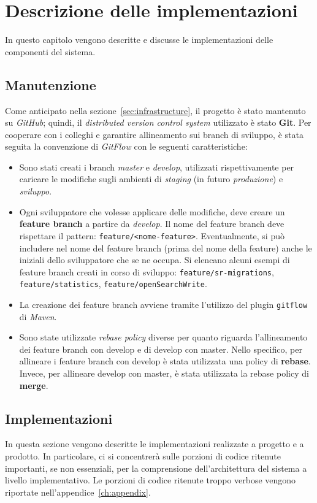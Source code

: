 \clearpage
\chapter{Descrizione delle implementazioni}\label{ch:implementation}
In questo capitolo vengono descritte e discusse le implementazioni delle componenti del sistema.

\section{Manutenzione}\label{sec:mantainance}
Come anticipato nella sezione~\ref{sec:infrastructure}, il progetto è stato mantenuto su \textit{GitHub};
quindi, il \textit{distributed version control system} utilizzato è stato \textbf{Git}.
Per cooperare con i colleghi e garantire allineamento sui branch di sviluppo, è stata seguita la convenzione di \textit{GitFlow} con le seguenti caratteristiche:
\begin{itemize}
    \item Sono stati creati i branch \textit{master} e \textit{develop}, utilizzati rispettivamente per caricare le modifiche sugli ambienti di \textit{staging} (in futuro \textit{produzione}) e \textit{sviluppo}.
    \item Ogni sviluppatore che volesse applicare delle modifiche, deve creare un \textbf{feature branch} a partire da \textit{develop}.
    Il nome del feature branch deve rispettare il pattern: \texttt{feature/<nome-feature>}.
    Eventualmente, si può includere nel nome del feature branch (prima del nome della feature) anche le iniziali dello sviluppatore che se ne occupa.
    Si elencano alcuni esempi di feature branch creati in corso di sviluppo: \texttt{feature/sr-migrations}, \texttt{feature/statistics}, \texttt{feature/openSearchWrite}.
    \item La creazione dei feature branch avviene tramite l'utilizzo del plugin \texttt{gitflow} di \textit{Maven}.
    \item Sono state utilizzate \textit{rebase policy} diverse per quanto riguarda l'allineamento dei feature branch con develop e di develop con master.
    Nello specifico, per allineare i feature branch con develop è stata utilizzata una policy di \textbf{rebase}.
    Invece, per allineare develop con master, è stata utilizzata la rebase policy di \textbf{merge}.
\end{itemize}

\section{Implementazioni}\label{sec:implementations}
In questa sezione vengono descritte le implementazioni realizzate a progetto e a prodotto.
In particolare, ci si concentrerà sulle porzioni di codice ritenute importanti, se non essenziali, per la comprensione dell'architettura del sistema a livello implementativo.
Le porzioni di codice ritenute troppo verbose vengono riportate nell'appendice~\ref{ch:appendix}.

